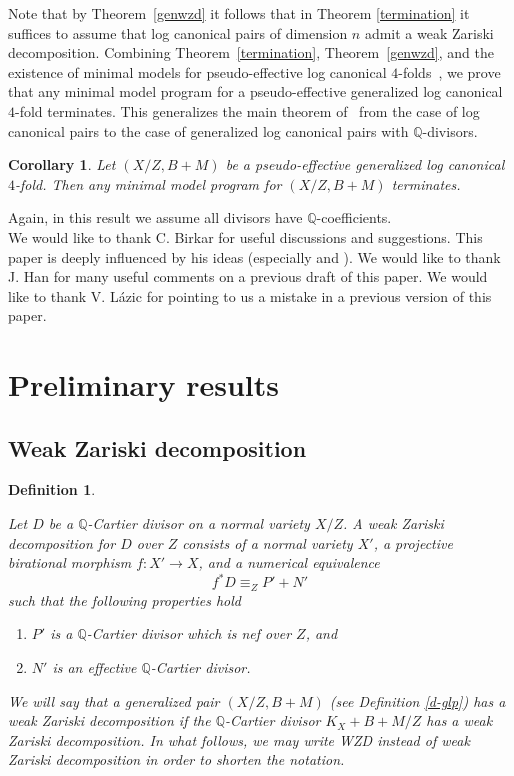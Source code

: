 \documentclass{amsart}
\renewcommand{\qq}{\mathbb{Q}}
\newtheorem{introcor}{Corollary}
\newtheorem{definition}[theorem]{Definition}
\theoremstyle{remark}
\numberwithin{equation}{section}
\begin{document}
Note that by Theorem~\ref{genwzd} it follows that in Theorem \ref{termination} it suffices to assume that  log canonical pairs of dimension $n$
admit a weak Zariski decomposition. 
Combining Theorem~\ref{termination}, Theorem~\ref{genwzd}, and the existence of minimal models for
pseudo-effective log canonical $4$-folds~\cite{Shok09}, we prove that any minimal model program for a pseudo-effective generalized log canonical $4$-fold terminates. 
This generalizes the main theorem of~\cite{Mor18} from the case of log canonical pairs
to the case of generalized log canonical pairs with $\qq$-divisors.

\begin{introcor}\label{4-fold-generalized-termination}
Let $(X/Z,B+M)$ be a pseudo-effective generalized log canonical $4$-fold.
Then any minimal model program for $(X/Z,B+M)$ terminates.
\end{introcor}

Again, in this result we assume all divisors have $\qq$-coefficients.\\

 We would like to thank C. Birkar for useful discussions and suggestions. 
This paper is deeply influenced by his ideas (especially \cite{Bir07} and \cite{Bir12a}). 
We would like to thank J. Han for many useful comments on a previous draft of this paper. 
We would like to thank V. L\'azic for pointing to us a mistake in a previous version of this paper.

\section{Preliminary results}

\subsection{Weak Zariski decomposition}

\begin{definition}\label{wzd}
{\rm Let $D$ be a $\qq$-Cartier divisor on a normal variety $X/Z$. A {\em weak Zariski decomposition for $D$ over $Z$}
consists of a normal variety $X'$, a projective birational morphism $f \colon X' \rightarrow X$, 
and a numerical equivalence 
\[
f^*D \equiv_{Z} P'+N'
\]
such that the following properties hold
\begin{enumerate}
\item $P'$ is a $\qq$-Cartier divisor which is nef over $Z$, and
\item $N'$ is an effective $\qq$-Cartier divisor.
\end{enumerate}
We will say that a generalized pair $(X/Z,B+M)$ (see Definition \ref{d-glp}) has a {\em weak Zariski decomposition} if
the $\qq$-Cartier divisor $K_X+B+M/Z$ has a weak Zariski decomposition.
In what follows, we may write {\em WZD} instead of weak Zariski decomposition in order to shorten the notation.}
\end{definition}
\end{document}

